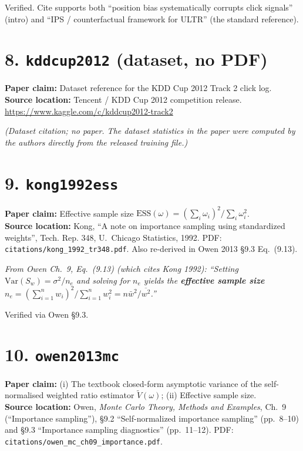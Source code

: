 \documentclass[11pt]{article}
\newcommand{\paperclaim}[1]{\textbf{Paper claim:} #1}
\newcommand{\source}[1]{\textbf{Source location:} #1}
\newcommand{\quoted}[1]{\begin{tcolorbox}\textit{#1}\end{tcolorbox}}
\begin{document}
\noindent Verified. Cite supports both ``position bias systematically
corrupts click signals'' (intro) and ``IPS / counterfactual framework
for ULTR'' (the standard reference).

\bigskip

\section*{8. \texttt{kddcup2012} (dataset, no PDF)}
\paperclaim{Dataset reference for the KDD Cup 2012 Track 2 click log.}\\
\source{Tencent / KDD Cup 2012 competition release.
\url{https://www.kaggle.com/c/kddcup2012-track2}}

\quoted{(Dataset citation; no paper. The dataset statistics in the paper
were computed by the authors directly from the released training file.)}

\bigskip

\section*{9. \texttt{kong1992ess}}
\paperclaim{Effective sample size $\mathrm{ESS}(\omega) = (\sum_i\omega_i)^2
/ \sum_i\omega_i^2$.}\\
\source{Kong, ``A note on importance sampling using standardized weights'',
Tech. Rep. 348, U.\ Chicago Statistics, 1992.
PDF: \texttt{citations/kong\_1992\_tr348.pdf}. Also re-derived in
Owen 2013 §9.3 Eq.~(9.13).}

\quoted{From Owen Ch.~9, Eq.~(9.13) (which cites Kong 1992): ``Setting
$\mathrm{Var}(S_w) = \sigma^2/n_e$ and solving for $n_e$ yields the
\textbf{effective sample size}
$n_e = (\sum_{i=1}^n w_i)^2 / \sum_{i=1}^n w_i^2 = n\bar w^2 / \overline{w^2}$.''}

\noindent Verified via Owen \S9.3.

\bigskip

\section*{10. \texttt{owen2013mc}}
\paperclaim{(i) The textbook closed-form asymptotic variance of the
self-normalised weighted ratio estimator $\widetilde V(\omega)$;
(ii) Effective sample size.}\\
\source{Owen, \emph{Monte Carlo Theory, Methods and Examples}, Ch.~9
(``Importance sampling''), \S9.2 ``Self-normalized importance sampling''
(pp.~8--10) and \S9.3 ``Importance sampling diagnostics''
(pp.~11--12). PDF: \texttt{citations/owen\_mc\_ch09\_importance.pdf}.}
\end{document}
